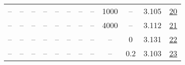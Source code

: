 \begin{table}[H]
\begin{tabular}{cccccccccccc}
-- & -- & -- & -- & -- & -- & -- & -- & 1000 & -- & 3.105 & \href{https://wandb.ai/stanford-mercury/optimizer-scaling/runs/sweep-520m-10B-mars92cf12lr0.008-wd0.1-minlr0-warmup1000-b10.95--af09eb}{20} \\
-- & -- & -- & -- & -- & -- & -- & -- & 4000 & -- & 3.112 & \href{https://wandb.ai/stanford-mercury/optimizer-scaling/runs/sweep-520m-10B-mars77a9fflr0.008-wd0.1-minlr0-warmup4000-b10.95--986850}{21} \\
-- & -- & -- & -- & -- & -- & -- & -- & -- & 0 & 3.131 & \href{https://wandb.ai/stanford-mercury/optimizer-scaling/runs/sweep-520m-10B-mars957dd2lr0.008-wd0-minlr0-warmup2000-b10.95-b2-d9df97}{22} \\
-- & -- & -- & -- & -- & -- & -- & -- & -- & 0.2 & 3.103 & \href{https://wandb.ai/stanford-mercury/optimizer-scaling/runs/sweep-520m-10B-marsca8afflr0.008-wd0.2-minlr0-warmup2000-b10.95--23909d}{23} \\
\bottomrule
\end{tabular}
\end{table}

